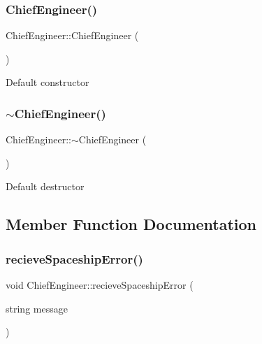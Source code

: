 \subsubsection{\texorpdfstring{Chief\+Engineer()}{ChiefEngineer()}}
{\footnotesize\ttfamily Chief\+Engineer\+::\+Chief\+Engineer (\begin{DoxyParamCaption}{ }\end{DoxyParamCaption})\hspace{0.3cm}{\ttfamily [inline]}}

Default constructor \mbox{\label{classChiefEngineer_aa647c8d8f2d872dc3838211725fd05db}} 
\subsubsection{\texorpdfstring{$\sim$\+Chief\+Engineer()}{~ChiefEngineer()}}
{\footnotesize\ttfamily Chief\+Engineer\+::$\sim$\+Chief\+Engineer (\begin{DoxyParamCaption}{ }\end{DoxyParamCaption})\hspace{0.3cm}{\ttfamily [inline]}}

Default destructor 

\subsection{Member Function Documentation}
\mbox{\label{classChiefEngineer_a7170ae93d7eadc1a68bc86c25a9be0db}} 
\subsubsection{\texorpdfstring{recieve\+Spaceship\+Error()}{recieveSpaceshipError()}}
{\footnotesize\ttfamily void Chief\+Engineer\+::recieve\+Spaceship\+Error (\begin{DoxyParamCaption}\item[{string}]{message }\end{DoxyParamCaption})\hspace{0.3cm}{\ttfamily [virtual]}}

